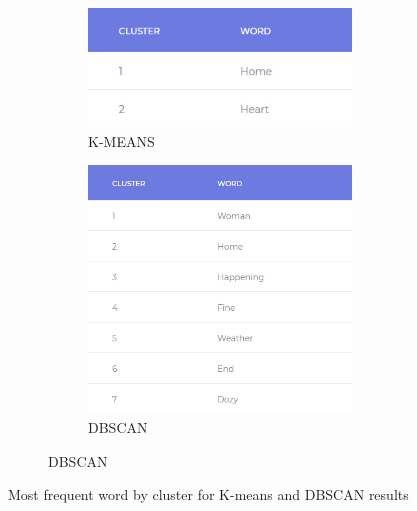 \documentclass{article}
\begin{document}
\begin{figure}[H]
    \centering 
    \begin{subfigure}{1\textwidth}  
        \begin{subfigure}{.5\textwidth}
            \centering   
            \includegraphics[width=1\linewidth]{./img/kmeantb.jpg}
            \caption{K-MEANS}
        \end{subfigure}
        \begin{subfigure}{.5\textwidth}  
            \centering 
            \includegraphics[width=1\linewidth]{./img/dbscantb.jpg}
            \caption{DBSCAN}
        \end{subfigure}                
    \end{subfigure}
    \caption{Most frequent word by cluster for K-means and DBSCAN results}
    \label{fig:table}
\end{figure}
\end{document}
